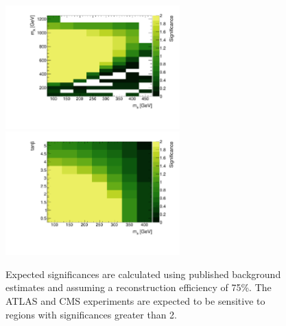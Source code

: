 \begin{figure}
\centering
\includegraphics[width=0.6\textwidth]{texinputs/04_grid/figures/monoz/leptonic/mAma_Significance_ll.pdf}
\includegraphics[width=0.6\textwidth]{texinputs/04_grid/figures/monoz/leptonic/tanbma_Significance_ll.pdf}
\caption{Expected significances are calculated using published background estimates and assuming a reconstruction efficiency of 75\%.  The ATLAS and CMS experiments are expected to be sensitive to regions with significances greater than 2.}
\label{fig:expected_significance_monozll}
\end{figure}

